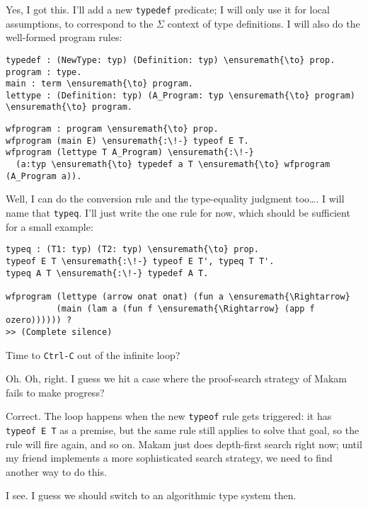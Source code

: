 \heroSTUDENT{} Yes, I got this. I'll add a new \texttt{typedef} predicate; I
will only use it for local assumptions, to correspond to the \(\Sigma\)
context of type definitions. I will also do the well-formed program
rules:

\begin{verbatim}
typedef : (NewType: typ) (Definition: typ) \ensuremath{\to} prop.
program : type. 
main : term \ensuremath{\to} program. 
lettype : (Definition: typ) (A_Program: typ \ensuremath{\to} program) \ensuremath{\to} program.
\end{verbatim}

\importantCodeblock{}

\begin{verbatim}
wfprogram : program \ensuremath{\to} prop.
wfprogram (main E) \ensuremath{:\!-} typeof E T.
wfprogram (lettype T A_Program) \ensuremath{:\!-}
  (a:typ \ensuremath{\to} typedef a T \ensuremath{\to} wfprogram (A_Program a)).
\end{verbatim}

\importantCodeblockEnd{}

\noindent
Well, I can do the conversion rule and the type-equality judgment
too\ldots{}. I will name that \texttt{typeq}. I'll just write the one
rule for now, which should be sufficient for a small example:

\begin{verbatim}
typeq : (T1: typ) (T2: typ) \ensuremath{\to} prop.
typeof E T \ensuremath{:\!-} typeof E T', typeq T T'.
typeq A T \ensuremath{:\!-} typedef A T.

wfprogram (lettype (arrow onat onat) (fun a \ensuremath{\Rightarrow}
          (main (lam a (fun f \ensuremath{\Rightarrow} (app f ozero)))))) ?
>> (Complete silence)
\end{verbatim}

\heroADVISOR{} Time to \texttt{Ctrl-C} out of the infinite loop?

\heroSTUDENT{} Oh. Oh, right. I guess we hit a case where the proof-search
strategy of Makam fails to make progress?

\heroADVISOR{} Correct. The loop happens when the new \texttt{typeof} rule
gets triggered: it has \texttt{typeof\ E\ T\textquotesingle{}} as a
premise, but the same rule still applies to solve that goal, so the rule
will fire again, and so on. Makam just does depth-first search right
now; until my friend implements a more sophisticated search strategy, we
need to find another way to do this.

\heroSTUDENT{} I see. I guess we should switch to an algorithmic type system
then.

